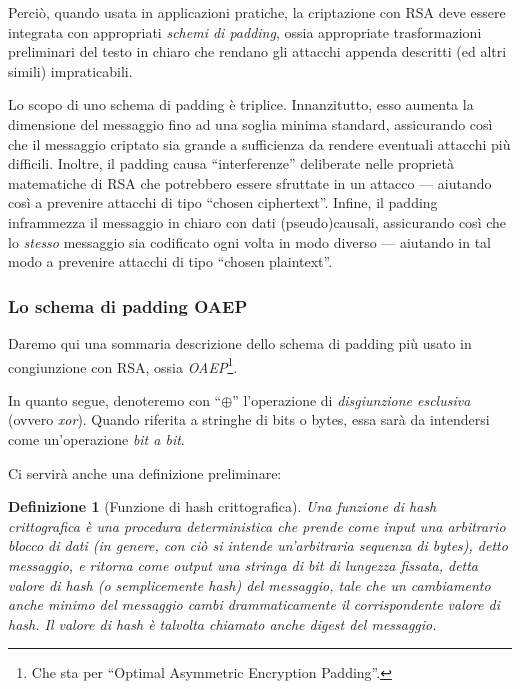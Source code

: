 \documentclass[pdflatex,11pt,a4paper,oneside]{article}
\let\OldEmph\emph
\renewcommand{\emph}[1]{\OldEmph{#1\/}}
\newtheorem{definition}[TheoremLike]{Definizione}
\begin{document}
Perci\`o, quando usata in applicazioni pratiche, la criptazione con RSA
deve essere integrata con appropriati \emph{schemi di padding}, ossia
appropriate trasformazioni preliminari del testo in chiaro che rendano
gli attacchi appenda descritti (ed altri simili) impraticabili.

Lo scopo di uno schema di padding \`e triplice. Innanzitutto, esso aumenta
la dimensione del messaggio fino ad una soglia minima standard,
assicurando cos\`i che il messaggio criptato sia grande a sufficienza da
rendere eventuali attacchi pi\`u difficili.  Inoltre, il padding causa
``interferenze'' deliberate nelle propriet\`a matematiche di RSA che
potrebbero essere sfruttate in un attacco --- aiutando cos\`i a prevenire
attacchi di tipo ``chosen ciphertext''. Infine, il padding inframmezza il
messaggio in chiaro con dati (pseudo)causali, assicurando cos\`i che lo
\emph{stesso} messaggio sia codificato ogni volta in modo diverso ---
aiutando in tal modo a prevenire attacchi di tipo ``chosen plaintext''.

\subsubsection{Lo schema di padding OAEP}
%
Daremo qui una sommaria descrizione dello schema di padding pi\`u
usato in congiunzione con RSA, ossia \emph{OAEP}\footnote{Che sta
per ``Optimal Asymmetric Encryption Padding''.}.

\medskip\noindent
In quanto segue, denoteremo con ``$\oplus$'' l'operazione di
\emph{disgiunzione esclusiva} (ovvero \emph{xor}).  Quando riferita
a stringhe di bits o bytes, essa sar\`a da intendersi come
un'operazione \emph{bit a bit}.

\medskip\noindent
Ci servir\`a anche una definizione preliminare:
\vspace*{-5pt}
\begin{definition}[Funzione di hash crittografica]
Una \emph{funzione di hash crittografica} \`e una procedura deterministica
che prende come input una arbitrario blocco di dati (in genere, con ci\`o
si intende un'arbitraria sequenza di bytes), detto \emph{messaggio}, e
ritorna come output una stringa di bit di lungezza fissata, detta
\emph{valore di hash} (o semplicemente \emph{hash}) del messaggio, tale
che un cambiamento anche minimo del messaggio cambi drammaticamente il
corrispondente valore di hash.  Il valore di hash \`e talvolta chiamato
anche \emph{digest} del messaggio.
\end{definition}
\end{document}
